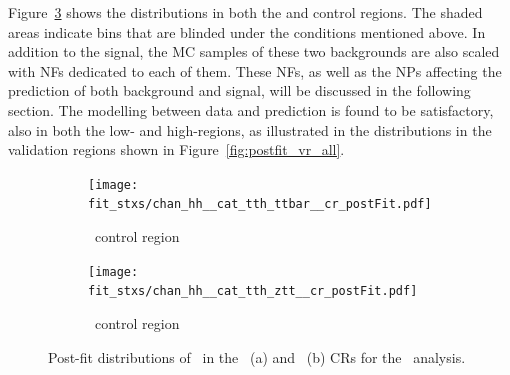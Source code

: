 Figure~\ref{fig:postfit_cr_both} shows the \mtt distributions in both the \ztautau and \ttbar control regions. The shaded areas indicate bins that are blinded under the conditions mentioned above. In addition to the signal, the MC samples of these two backgrounds are also scaled with NFs dedicated to each of them. These NFs, as well as the NPs affecting the prediction of both background and signal, will be discussed in the following section. The modelling between data and prediction is found to be satisfactory, also in both the low- and high-\pth regions, as illustrated in the \mtt distributions in the validation regions shown in Figure~\ref{fig:postfit_vr_all}.
\begin{figure}[htbp]
  \centering

  \begin{subfigure}[b]{0.48\textwidth}
    \centering
    \texttt{[image: fit\_stxs/chan\_hh\_\_cat\_tth\_ttbar\_\_cr\_postFit.pdf]}
    \caption{\small \ttbar\ control region}
    \label{fig:postfit_cr_ttbar}
  \end{subfigure}\hfill
  \begin{subfigure}[b]{0.48\textwidth}
    \centering
    \texttt{[image: fit\_stxs/chan\_hh\_\_cat\_tth\_ztt\_\_cr\_postFit.pdf]}
    \caption{\small \ztautau\ control region}
    \label{fig:postfit_cr_ztt}
  \end{subfigure}

  \caption{Post-fit distributions of \mtt\ in the \ttbar\ (a) and \ztautau\ (b) CRs for the \ttH\ analysis.}
  \label{fig:postfit_cr_both}
\end{figure}

